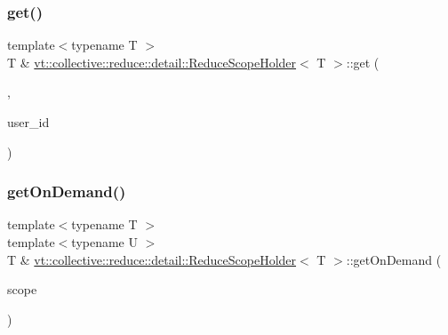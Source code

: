 \mbox{\label{structvt_1_1collective_1_1reduce_1_1detail_1_1_reduce_scope_holder_a2413b5fd1fbd0b87b09d81240000e5f8}} 
\subsubsection{\texorpdfstring{get()}{get()}\hspace{0.1cm}{\footnotesize\ttfamily [6/6]}}
{\footnotesize\ttfamily template$<$typename T $>$ \\
T \& \hyperlink{structvt_1_1collective_1_1reduce_1_1detail_1_1_reduce_scope_holder}{vt\+::collective\+::reduce\+::detail\+::\+Reduce\+Scope\+Holder}$<$ T $>$\+::get (\begin{DoxyParamCaption}\item[{\hyperlink{structvt_1_1collective_1_1reduce_1_1detail_1_1_reduce_scope_holder_1_1_user_i_d_tag}{User\+I\+D\+Tag}}]{,  }\item[{\hyperlink{namespacevt_1_1collective_1_1reduce_1_1detail_ae82d7b96b0885b9b7dfb0104398beead}{User\+I\+D\+Type}}]{user\+\_\+id }\end{DoxyParamCaption})}

\mbox{\label{structvt_1_1collective_1_1reduce_1_1detail_1_1_reduce_scope_holder_a47aca26691aaff13b240cb2109b189dc}} 
\subsubsection{\texorpdfstring{get\+On\+Demand()}{getOnDemand()}}
{\footnotesize\ttfamily template$<$typename T $>$ \\
template$<$typename U $>$ \\
T \& \hyperlink{structvt_1_1collective_1_1reduce_1_1detail_1_1_reduce_scope_holder}{vt\+::collective\+::reduce\+::detail\+::\+Reduce\+Scope\+Holder}$<$ T $>$\+::get\+On\+Demand (\begin{DoxyParamCaption}\item[{U \&\&}]{scope }\end{DoxyParamCaption})}

